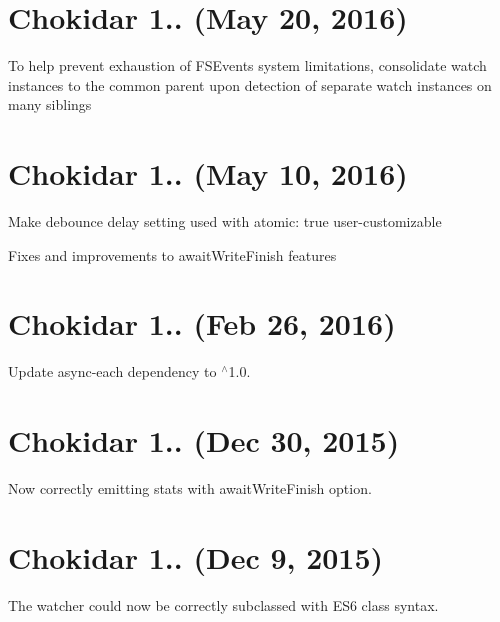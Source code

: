 \section*{Chokidar 1.. (May 20, 2016)}


\begin{DoxyItemize}
\item To help prevent exhaustion of F\+S\+Events system limitations, consolidate watch instances to the common parent upon detection of separate watch instances on many siblings
\end{DoxyItemize}

\section*{Chokidar 1.. (May 10, 2016)}


\begin{DoxyItemize}
\item Make debounce delay setting used with {\ttfamily atomic\+: true} user-\/customizable
\item Fixes and improvements to {\ttfamily await\+Write\+Finish} features
\end{DoxyItemize}

\section*{Chokidar 1.. (Feb 26, 2016)}


\begin{DoxyItemize}
\item Update async-\/each dependency to $^\wedge$1.0.
\end{DoxyItemize}

\section*{Chokidar 1.. (Dec 30, 2015)}


\begin{DoxyItemize}
\item Now correctly emitting {\ttfamily stats} with {\ttfamily await\+Write\+Finish} option.
\end{DoxyItemize}

\section*{Chokidar 1.. (Dec 9, 2015)}


\begin{DoxyItemize}
\item The watcher could now be correctly subclassed with E\+S6 class syntax.
\end{DoxyItemize}

